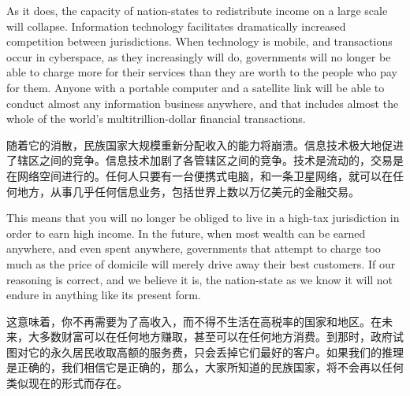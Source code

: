 \begin{Parallel}{97mm}{45mm}
  \ParallelPar  

  \ParallelLText
  {\small As it does, the capacity of nation-states to redistribute income on a large scale will collapse. Information technology facilitates dramatically increased competition between jurisdictions. When technology is mobile, and transactions occur in cyberspace, as they increasingly will do, governments will no longer be able to charge more for their services than they are worth to the people who pay for them. Anyone with a portable computer and a satellite link will be able to conduct almost any information business anywhere, and that includes almost the whole of the world's multitrillion-dollar financial transactions.  }
  
  \ParallelRText
  {\small 随着它的消散，民族国家大规模重新分配收入的能力将崩溃。信息技术极大地促进了辖区之间的竞争。信息技术加剧了各管辖区之间的竞争。技术是流动的，交易是在网络空间进行的。任何人只要有一台便携式电脑，和一条卫星网络，就可以在任何地方，从事几乎任何信息业务，包括世界上数以万亿美元的金融交易。 }


  \ParallelPar  
  \ParallelLText
  {This means that you will no longer be obliged to live in a high-tax jurisdiction in order to earn high income. In the future, when most wealth can be earned anywhere, and even spent anywhere, governments that attempt to charge too much as the price of domicile will merely drive away their best customers. If our reasoning is correct, and we believe it is, the nation-state as we know it will not endure in anything like its present form.  }
  
  \ParallelRText
  {\small 这意味着，你不再需要为了高收入，而不得不生活在高税率的国家和地区。在未来，大多数财富可以在任何地方赚取，甚至可以在任何地方消费。到那时，政府试图对它的永久居民收取高额的服务费，只会丢掉它们最好的客户。如果我们的推理是正确的，我们相信它是正确的，那么，大家所知道的民族国家，将不会再以任何类似现在的形式而存在。 }
  \ParallelPar


\end{Parallel}
